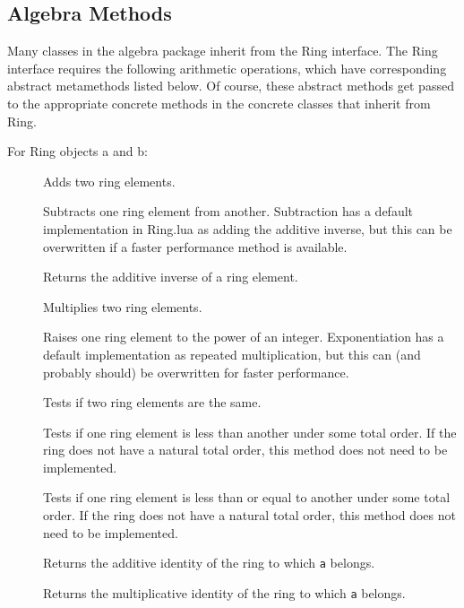\documentclass{article}
\begin{document}

\subsection{Algebra Methods}

Many classes in the algebra package inherit from the {\ttfamily Ring} interface. The {\ttfamily Ring} interface requires the following arithmetic operations, which have corresponding abstract metamethods listed below. Of course, these abstract methods get passed to the appropriate concrete methods in the concrete classes that inherit from {\ttfamily Ring}.

For {\ttfamily Ring} objects {\ttfamily a} and {\ttfamily b}:

\begin{description}%
    \item[] Adds two ring elements.
    \item[] Subtracts one ring element from another. Subtraction has a default implementation in {\ttfamily Ring.lua} as adding the additive inverse, but this can be overwritten if a faster performance method is available.
    \item[] Returns the additive inverse of a ring element.
    \item[] Multiplies two ring elements.
    \item[] Raises one ring element to the power of an integer. Exponentiation has a default implementation as repeated multiplication, but this can (and probably should) be overwritten for faster performance.
    \item[] Tests if two ring elements are the same.
    \item[] Tests if one ring element is less than another under some total order. If the ring does not have a natural total order, this method does not need to be implemented.
    \item[] Tests if one ring element is less than or equal to another under some total order. If the ring does not have a natural total order, this method does not need to be implemented.
    \item[] Returns the additive identity of the ring to which \texttt{a} belongs.
    \item[] Returns the multiplicative identity of the ring to which \texttt{a} belongs.
\end{description}
\end{document}
